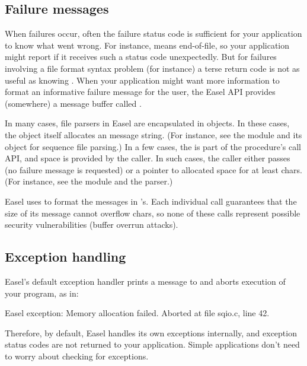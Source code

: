 \subsection{Failure messages} 

When failures occur, often the failure status code is sufficient for
your application to know what went wrong. For instance, 
means end-of-file, so your application might report  if it receives such a status code unexpectedly. But for
failures involving a file format syntax problem (for instance) a terse
 return code is not as useful as knowing
. When your application might want
more information to format an informative failure message for the
user, the Easel API provides (somewhere) a message buffer called
.

In many cases, file parsers in Easel are encapsulated in objects. In
these cases, the object itself allocates an  message
string. (For instance, see the  module and its
 object for sequence file parsing.)  In a few
cases, the  is part of the procedure's call API, and
space is provided by the caller. In such cases, the caller either
passes  (no failure message is requested) or a pointer to
allocated space for at least  chars. (For
instance, see the  module and the
 parser.)

Easel uses  to format the messages in
's. Each individual call guarantees that the size of
its message cannot overflow  chars, so none of
these  calls represent possible security
vulnerabilities (buffer overrun attacks).


\subsection{Exception handling}

Easel's default exception handler prints a message to 
and aborts execution of your program, as in:

\begin{cchunk}
   Easel exception: Memory allocation failed.
   Aborted at file sqio.c, line 42. 
\end{cchunk}

Therefore, by default, Easel handles its own exceptions internally,
and exception status codes are not returned to your
application. Simple applications don't need to worry about checking
for exceptions.

